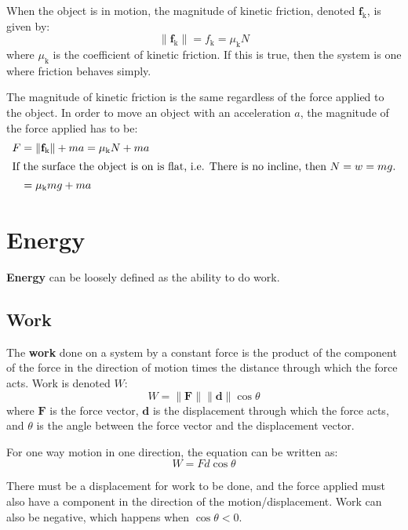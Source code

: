 \documentclass{article}
\newcommand{\definition}[1]{\begin{tcolorbox}[colback=red!5!white,colframe=red!75!black,parbox=false] #1 \end{tcolorbox}}
\begin{document}
When the object is in motion, the magnitude of kinetic friction, denoted $\mathbf{f}_{\text{k}}$, is given by:
\begin{equation*}
	\lVert \mathbf{f}_{\text{k}}\rVert =f_{\text{k}}=\mu_{\text{k}} N
\end{equation*}
where $\mu_{\text{k}}$ is the coefficient of kinetic friction. If this is true, then the system is one where friction behaves simply.

The magnitude of kinetic friction is the same regardless of the force applied to the object. In order to move an object with an acceleration $a$, the magnitude of the force applied has to be:
\begin{align*}
	F
	&=\lVert \mathbf{f}_{\text{k}} \rVert +ma
	=\mu_{\text{k}}N+ma \\
	\intertext{If the surface the object is on is flat, i.e. There is no incline, then $N=w=mg$.}
	&=\mu_{\text{k}}mg+ma
\end{align*}

\section{Energy}

\definition{\textbf{Energy} can be loosely defined as the ability to do work.}

\subsection{Work}

\definition{The \textbf{work} done on a system by a constant force is the product of the component of the force in the direction of motion times the distance through which the force acts. Work is denoted $W$:
\begin{equation*}
    W=\lVert \mathbf{F} \rVert \lVert \mathbf{d} \rVert \cos \theta
\end{equation*}
where $\mathbf{F}$ is the force vector, $\mathbf{d}$ is the displacement through which the force acts, and $\theta$ is the angle between the force vector and the displacement vector.
}

For one way motion in one direction, the equation can be written as:
\begin{equation*}
    W=Fd\cos\theta
\end{equation*}

There must be a displacement for work to be done, and the force applied must also have a component in the direction of the motion/displacement. Work can also be negative, which happens when $\cos\theta<0$.
\end{document}
